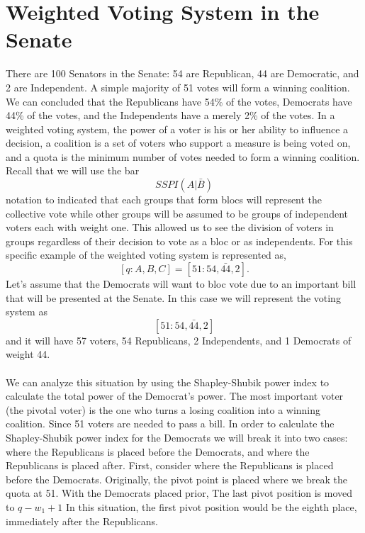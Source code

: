 \documentclass[12pt]{article}
\begin{document}


\section{Weighted Voting System in the Senate}
There are 100 Senators in the Senate: 54 are Republican, 44 are Democratic, and 2 are Independent. A simple majority of 51 votes will form a winning coalition. We can concluded that the Republicans have 54\% of the votes, Democrats have 44\% of the votes, and the Independents have a merely 2\% of the votes. In a weighted voting system, the power of a voter is his or her ability to influence a decision, a coalition is a set of voters who support a measure is being voted on, and a quota is the minimum number of votes needed to form a winning coalition. Recall that we will use the bar \begin{equation}
SSPI(A|\bar{B})
\end{equation} notation to indicated that each groups that form blocs will represent the collective vote while other groups will be assumed to be groups of independent voters each with weight one. This allowed us to see the division of voters in groups regardless of their decision to vote as a bloc or as independents. For this specific example of the weighted voting system is represented as, $$[q:A,B,C]=[51:54,\bar{44},2].$$
Let's assume that the Democrats will want to bloc vote due to an important bill that will be presented at the Senate. In this case we will represent the voting system as $$[51:54,\bar{44},2]$$ and it will have 57 voters, 54 Republicans, 2 Independents, and 1 Democrats of weight 44. 
\\
\\
\noindent We can analyze this situation by using the Shapley-Shubik power index to calculate the total power of the Democrat's power. The most important voter (the pivotal voter) is the one who turns a losing coalition into a winning coalition. Since 51 voters are needed to pass a bill. In order to calculate the Shapley-Shubik power index for the Democrats we will break it into two cases: where the Republicans is placed before the Democrats, and where the Republicans is placed after. First, consider where the Republicans is placed before the Democrats. Originally, the pivot point is placed where we break the quota at 51. With the Democrats placed prior, The last pivot position is moved to $q-w_1+1$ In this situation, the first pivot position would be the eighth place, immediately after the Republicans. 
\end{document}
